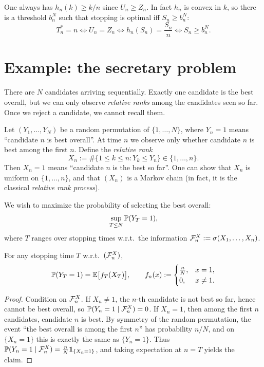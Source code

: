 \begin{remark}
One always has $h_n(k)\ge k/n$ since $U_n\ge Z_n$. In fact $h_n$ is convex in $k$, so there is a threshold
$b_n^N$ such that stopping is optimal iff $S_n\ge b_n^N$:
\[
T_n^\ast=n \iff U_n=Z_n \iff h_n(S_n)=\frac{S_n}{n} \iff S_n\ge b_n^N.
\]
\end{remark}

\section{Example: the secretary problem}

There are $N$ candidates arriving sequentially. Exactly one candidate is the best overall, but we can only
observe \emph{relative ranks} among the candidates seen so far. Once we reject a candidate, we cannot recall them.

Let $(Y_1,\dots,Y_N)$ be a random permutation of $\{1,\dots,N\}$, where $Y_n=1$ means ``candidate $n$ is best overall''.
At time $n$ we observe only whether candidate $n$ is best among the first $n$.
Define the \emph{relative rank}
\[
X_n := \#\{1\le k\le n : Y_k \le Y_n\}\in\{1,\dots,n\}.
\]
Then $X_n=1$ means ``candidate $n$ is the best so far''. One can show that $X_n$ is uniform on $\{1,\dots,n\}$, and
that $(X_n)$ is a Markov chain (in fact, it is the classical \emph{relative rank process}).

\medskip
We wish to maximize the probability of selecting the best overall:
\[
\sup_{T\le N} \mathbb{P}(Y_T=1),
\]
where $T$ ranges over stopping times w.r.t.\ the information $\mathcal{F}_n^X:=\sigma(X_1,\dots,X_n)$.

\begin{proposition}
For any stopping time $T$ w.r.t.\ $(\mathcal{F}_n^X)$,
\[
\mathbb{P}(Y_T=1) = \mathbb{E}\bigl[f_T(X_T)\bigr],
\qquad
f_n(x):=\begin{cases}
\frac{n}{N}, & x=1,\\
0, & x\ne 1.
\end{cases}
\]
\end{proposition}

\begin{proof}
Condition on $\mathcal{F}_n^X$. If $X_n\ne 1$, the $n$-th candidate is not best so far, hence cannot be best overall,
so $\mathbb{P}(Y_n=1\mid \mathcal{F}_n^X)=0$. If $X_n=1$, then among the first $n$ candidates, candidate $n$ is best.
By symmetry of the random permutation, the event ``the best overall is among the first $n$'' has probability $n/N$,
and on $\{X_n=1\}$ this is exactly the same as $\{Y_n=1\}$. Thus $\mathbb{P}(Y_n=1\mid \mathcal{F}_n^X)=\frac{n}{N}\mathbf{1}_{\{X_n=1\}}$,
and taking expectation at $n=T$ yields the claim.
\end{proof}

